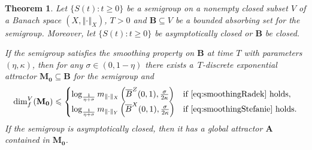 \documentclass[a4paper,12pt,reqno]{amsart}
\theoremstyle{plain}
\newtheorem{thm}[lem]{Theorem}
\theoremstyle{definition}
\numberwithin{equation}{section}
\newcommand{\norm}[1]{\left\Vert#1\right\Vert}
\newcommand{\dimf}{\operatorname{dim}_{f}}
\renewcommand{\geq}{\geqslant}
\renewcommand{\leq}{\leqslant}
\begin{document}
\begin{thm}\label{thm:expattr_smooth}
Let $\{S(t)\colon t\geq 0\}$ be a semigroup on a nonempty closed subset $V$ of a Banach space $(X,\norm{\cdot}_{X})$, $T>0$  and $\mathbf{B}\subseteq V$ be a bounded absorbing set for the semigroup. Moreover, let $\{S(t)\colon t\geq 0\}$ be asymptotically closed or $\mathbf{B}$ be closed. 

If the semigroup satisfies the smoothing property on $\mathbf{B}$ at time $T$ with parameters $(\eta,\kappa)$, then for any $\sigma\in(0,1-\eta)$ there exists a~$T$-discrete exponential attractor  $\mathbf{M_0}\subseteq \mathbf{B}$ for the semigroup and
\begin{equation*}
\dimf^{V}(\mathbf{M_0})\leq 
\begin{cases}
\log_{\frac{1}{\eta+\sigma}}m_{\|\cdot\|_X}\left(\overline{B}^Z(0,1),\frac{\sigma}{2\kappa}\right)& \text{if \eqref{eq:smoothingRadek} holds},\\
\log_{\frac{1}{\eta+\sigma}}m_{\|\cdot\|_Y}\left(\overline{B}^X(0,1),\frac{\sigma}{2\kappa}\right)& \text{if \eqref{eq:smoothingStefanie} holds}.
\end{cases}
\end{equation*}
If the semigroup is asymptotically closed, then it has a global attractor $\mathbf{A}$ contained in $\mathbf{M_0}$.
\end{thm}
\end{document}
